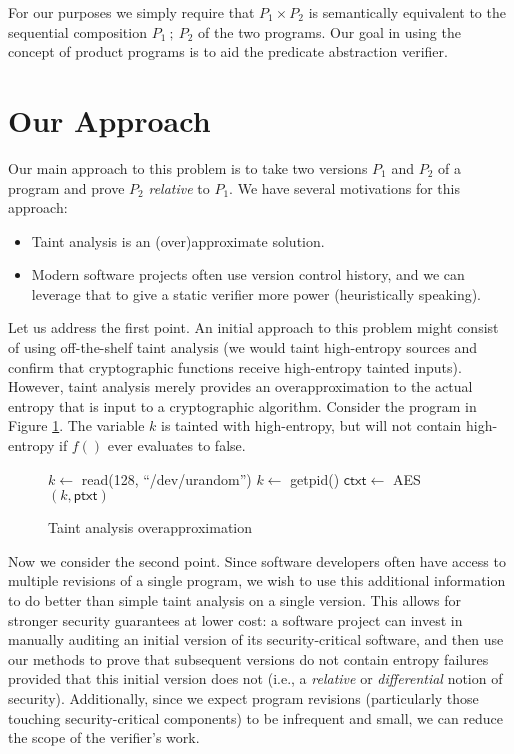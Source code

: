 \documentclass[letterpaper,twocolumn,10pt]{article}
\begin{document}
For our purposes we simply require that $P_1 \times P_2$ is semantically
equivalent to the sequential composition $P_1\ ;\ P_2$ of the two programs. Our goal in using the concept of product programs is to aid the predicate abstraction
verifier. 

\section{Our Approach}

Our main approach to this problem is to take two versions $P_1$ and $P_2$ of a program and prove $P_2$ \emph{relative} to $P_1$. We have several
motivations for this approach:

\begin{itemize}
    \item Taint analysis is an (over)approximate solution.
    \item Modern software projects often use version control history, and we can leverage that to give a static verifier more power (heuristically speaking).
\end{itemize}

Let us address the first point.
An initial approach to this problem
might consist of using off-the-shelf taint analysis (we would taint high-entropy sources and confirm that
cryptographic functions receive high-entropy tainted inputs). 
However, taint analysis merely provides an overapproximation to the actual entropy that is
input to a cryptographic algorithm. Consider the program in Figure
\ref{fig:prog1}. The variable $k$ is tainted with high-entropy, but will not contain high-entropy if $f()$ ever evaluates to false.

\begin{figure}
    \caption{Taint analysis overapproximation}
    \label{fig:prog1}
    \begin{center}
    \begin{algorithmic}
        
        \State $k \gets$ \textsf{read(128, ``/dev/urandom'')}
        \Else
        \State $k \gets$ \textsf{getpid()}
        \EndIf
        \State $\mathsf{ctxt} \gets $ \textsf{AES}$(k,\mathsf{ptxt})$
    \end{algorithmic}
\end{center}
\end{figure}

Now we consider the second point. Since software developers often have access to multiple revisions of a single program, we wish to use this additional information
to do better than simple taint analysis on a single version. This allows for stronger security guarantees at lower cost: a software project can invest
in manually auditing an initial version of its security-critical software, and then use our methods to prove that subsequent versions do not contain entropy
failures provided that this initial version does not (i.e., a \emph{relative} or \emph{differential} notion of security). Additionally, since we expect
program revisions (particularly those touching security-critical components) to be infrequent and small, we can reduce the scope of the verifier's work.
\end{document}
